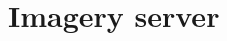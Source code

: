 \documentclass[17pt]{beamer}
\begin{document}






















\section{Imagery server}
\end{document}
